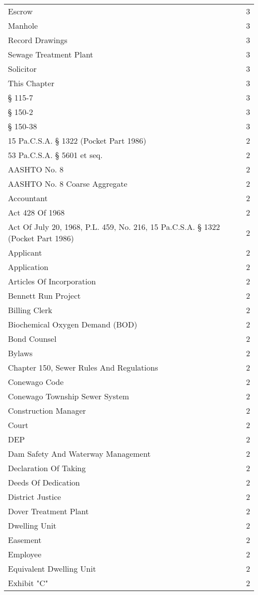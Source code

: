 \begin{longtable}{p{} p{}}
Escrow & 3 \\
Manhole & 3 \\
Record Drawings & 3 \\
Sewage Treatment Plant & 3 \\
Solicitor & 3 \\
This Chapter & 3 \\
§ 115-7 & 3 \\
§ 150-2 & 3 \\
§ 150-38 & 3 \\
15 Pa.C.S.A. § 1322 (Pocket Part 1986) & 2 \\
53 Pa.C.S.A. § 5601 et seq. & 2 \\
AASHTO No. 8 & 2 \\
AASHTO No. 8 Coarse Aggregate & 2 \\
Accountant & 2 \\
Act 428 Of 1968 & 2 \\
Act Of July 20, 1968, P.L. 459, No. 216, 15 Pa.C.S.A. § 1322 (Pocket Part 1986) & 2 \\
Applicant & 2 \\
Application & 2 \\
Articles Of Incorporation & 2 \\
Bennett Run Project & 2 \\
Billing Clerk & 2 \\
Biochemical Oxygen Demand (BOD) & 2 \\
Bond Counsel & 2 \\
Bylaws & 2 \\
Chapter 150, Sewer Rules And Regulations & 2 \\
Conewago Code & 2 \\
Conewago Township Sewer System & 2 \\
Construction Manager & 2 \\
Court & 2 \\
DEP & 2 \\
Dam Safety And Waterway Management & 2 \\
Declaration Of Taking & 2 \\
Deeds Of Dedication & 2 \\
District Justice & 2 \\
Dover Treatment Plant & 2 \\
Dwelling Unit & 2 \\
Easement & 2 \\
Employee & 2 \\
Equivalent Dwelling Unit & 2 \\
Exhibit "C" & 2 \\

\end{longtable}
